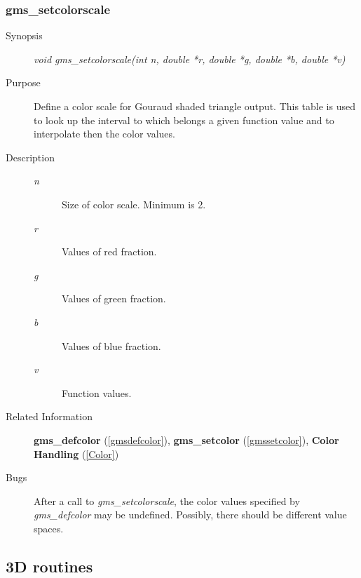 \subsubsection{gms\_setcolorscale\label{gmssetcolorscale}}
\begin{description}
\item[Synopsis]\mbox{}


{\em void    gms\_setcolorscale(int n, double *r, double *g, double *b,
double *v)\/}
\item[Purpose]\mbox{}


Define a color scale for Gouraud shaded triangle output.
This table is used to look up the interval to which belongs a 
given function value and to interpolate then the color values.
\item[Description]\mbox{}


\begin{description}
\item[{\em n\/}]\mbox{}

 Size of color scale. Minimum is 2. 
\item[{\em r\/}]\mbox{}

 Values of red fraction.
\item[{\em g\/}]\mbox{}

 Values of green fraction.
\item[{\em b\/}]\mbox{}

 Values of blue fraction.
\item[{\em v\/}]\mbox{}

 Function values.
\end{description}

\item[Related Information]\mbox{}


{\bf gms\_defcolor} (\ref{gmsdefcolor}), 
{\bf gms\_setcolor} (\ref{gmssetcolor}), 
{\bf Color Handling} (\ref{Color})
\item[Bugs]\mbox{}

 
After a call to {\em gms\_setcolorscale\/}, the color values
specified by {\em gms\_defcolor\/} may be undefined.
Possibly, there should be different value spaces.
\end{description}



\newpage



\subsection{3D routines \label{3Drefpages}}

